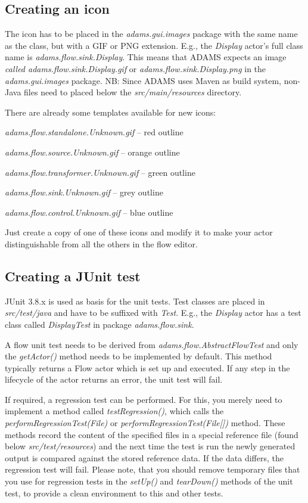 \subsection{Creating an icon}
The icon has to be placed in the \textit{adams.gui.images} package with the same
name as the class, but with a GIF or PNG extension. E.g., the \textit{Display}
actor's full class name is \textit{adams.flow.sink.Display}. This means that
ADAMS expects an image \textit{called adams.flow.sink.Display.gif} or
\textit{adams.flow.sink.Display.png} in the \textit{adams.gui.images} package.
NB: Since ADAMS uses Maven as build system, non-Java files need to placed below
the \textit{src/main/resources} directory.

There are already some templates available for new icons:
\begin{tight_itemize}
	\item \textit{adams.flow.standalone.Unknown.gif} -- red outline
	\item \textit{adams.flow.source.Unknown.gif} -- orange outline
	\item \textit{adams.flow.transformer.Unknown.gif} -- green outline
	\item \textit{adams.flow.sink.Unknown.gif} -- grey outline
	\item \textit{adams.flow.control.Unknown.gif} -- blue outline
\end{tight_itemize}
Just create a copy of one of these icons and modify it to make your actor
distinguishable from all the others in the flow editor.

\subsection{Creating a JUnit test}
JUnit 3.8.x  \cite{junit} is used as basis for the unit tests. Test classes are
placed in \textit{src/test/java} and have to be suffixed with \textit{Test}.
E.g., the \textit{Display} actor has a test class called \textit{DisplayTest}
in package \textit{adams.flow.sink}.

A flow unit test needs to be derived from \textit{adams.flow.AbstractFlowTest}
and only the \textit{getActor()} method needs to be implemented by default. This
method typically returns a Flow actor which is set up and executed. If any step
in the lifecycle of the actor returns an error, the unit test will fail.

If required, a regression test can be performed. For this, you merely need to
implement a method called \textit{testRegression()}, which calls the
\textit{performRegressionTest(File)} or \textit{performRegressionTest(File[])}
method. These methods record the content of the specified files in a special
reference file (found below \textit{src/test/resources}) and the next
time the test is run the newly generated output is compared against the stored
reference data. If the data differs, the regression test will fail. Please note,
that you should remove temporary files that you use for regression tests in the
\textit{setUp()} and \textit{tearDown()} methods of the unit test, to provide a
clean environment to this and other tests.

